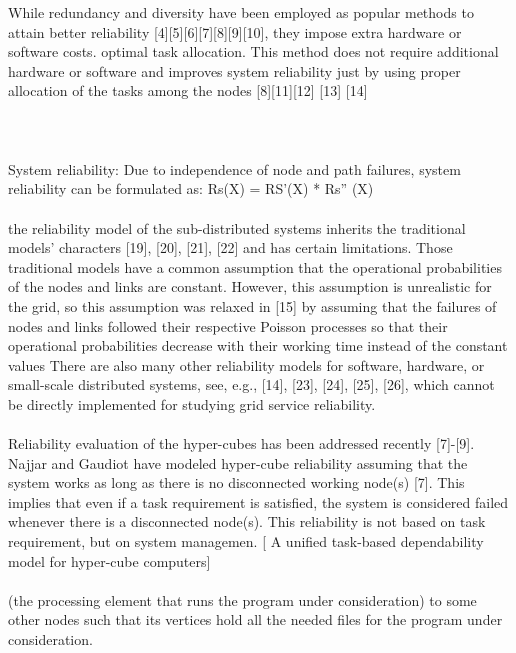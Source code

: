 \documentclass{cslthse-msc}
\begin{document}
\iffalse
While redundancy and diversity have been employed as popular methods to attain better reliability [4][5][6][7][8][9][10], they impose extra hardware or software costs.
optimal task allocation. This method does not require additional hardware or software and improves system reliability just by using proper allocation of the tasks among the nodes [8][11][12] [13] [14] \cite{optTaskAllocationForMaxRel}
\\\\
\cite{discContRelModel}
\\\\
System reliability: Due to independence of node and path failures, system reliability can be formulated as: Rs(X) = RS’(X) * Rs” (X) \cite{optTaskAllocationForMaxRel}
\\\\
the reliability model of the sub-distributed systems inherits the traditional models’ characters [19], [20], [21], [22] and has certain limitations. Those traditional models have a common assumption that the operational probabilities of the nodes and links are constant. However, this assumption is unrealistic for the grid, so this assumption was relaxed in [15] by assuming that the failures of nodes and links followed their respective Poisson processes so that their operational probabilities decrease with their working time instead of the constant values 
There are also many other reliability models for software, hardware, or small-scale distributed systems, see, e.g., [14], [23], [24], [25], [26], which cannot be directly implemented for studying grid service reliability. \cite{hierarchicalRelModeling}
\\\\
Reliability evaluation of the hyper-cubes has been addressed recently [7]-[9]. Najjar and Gaudiot have modeled hyper-cube reliability assuming that the system works as long as there is no disconnected working node(s) [7]. This implies that even if a task requirement is satisfied, the system is considered failed whenever there is a disconnected node(s). This reliability is not based on task requirement, but on system managemen.  [ A unified task-based dependability model for hyper-cube computers]
\\\\
(the processing element that runs the program under consideration) to some other nodes such that its vertices hold all the needed files for the program under consideration. \cite{relAnalysisFRA}
\\\\
\end{document}
